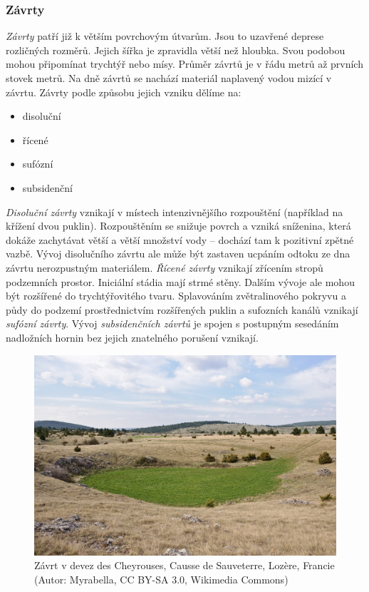 \subsubsection{Závrty}
\emph{Závrty} patří již k větším povrchovým útvarům. Jsou to uzavřené deprese rozličných rozměrů. Jejich šířka je zpravidla větší než hloubka. Svou podobou mohou připomínat trychtýř nebo mísy. Průměr závrtů je v řádu metrů až prvních stovek metrů. Na dně závrtů se nachází materiál naplavený vodou mizící v závrtu. Závrty podle způsobu jejich vzniku dělíme na:

\begin{itemize}
	\item disoluční
	\item řícené
	\item sufózní
	\item subsidenční
\end{itemize} 

\emph{Disoluční závrty} vznikají v místech intenzivnějšího rozpouštění (například na křížení dvou puklin). Rozpouštěním se snižuje povrch a vzniká sníženina, která dokáže zachytávat větší a větší množství vody -- dochází tam k pozitivní zpětné vazbě. Vývoj disolučního závrtu ale může být zastaven ucpáním odtoku ze dna závrtu nerozpustným materiálem. \emph{Řícené závrty} vznikají zřícením stropů podzemních prostor. Iniciální stádia mají strmé stěny. Dalším vývoje ale mohou být rozšířené do trychtýřovitého tvaru. Splavováním zvětralinového pokryvu a půdy do podzemí prostřednictvím rozšířených puklin a sufozních kanálů vznikají \emph{sufózní závrty}. Vývoj \emph{subsidenčních závrtů} je spojen s postupným sesedáním nadložních hornin bez jejich znatelného porušení vznikají.

\begin{figure}[h]
	\centering
	\includegraphics[width=1\linewidth]{obrazky/karst/doline}
	\caption{Závrt v  devez des Cheyrouses, Causse de Sauveterre, Lozère, Francie (Autor: Myrabella, CC BY-SA 3.0, Wikimedia Commons)}
\end{figure}

